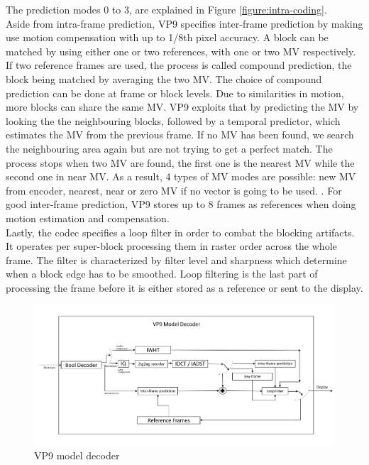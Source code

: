\documentclass[a4paper,11pt,oneside]{article}
\begin{document}
The prediction modes 0 to 3, are explained in Figure \ref{figure:intra-coding}. \\
Aside from intra-frame prediction, VP9 specifies inter-frame prediction by making use motion compensation with up to 1/8th pixel accuracy. A block can be matched by using either one or two references, with one or two MV respectively. If two reference frames are used, the process is called compound prediction, the block being matched by averaging the two MV. The choice of compound prediction can be done at frame or block levels. Due to similarities in motion, more blocks can share the same MV. VP9 exploits that by predicting the MV by looking the the neighbouring blocks, followed by a temporal predictor, which estimates the MV from the previous frame. If no MV has been found, we search the neighbouring area again but are not trying to get a perfect match. The process stops when two MV are found, the first one is the nearest MV while the second one in near MV. As a result, 4 types of MV modes are possible: new MV from encoder, nearest, near or zero MV if no vector is going to be used. \cite[pp.~20]{vp9_bitstream}. For good inter-frame prediction, VP9 stores up to 8 frames as references when doing motion estimation and compensation. \\
\indent Lastly, the codec specifies a loop filter in order to combat the blocking artifacts. It operates per super-block processing them in raster order across the whole frame. The filter is characterized by filter level and sharpness  which determine when a block edge has to be smoothed. Loop filtering is the last part of processing the frame before it is either stored as a reference or sent to the display.\\

\begin{figure}[h]
  \centering
  \includegraphics[width=\textwidth]{../figures/vp9_decoder(1).pdf}
  \caption{VP9 model decoder}
  \label{figure:vp9_decoder}
\end{figure} 
\end{document}
